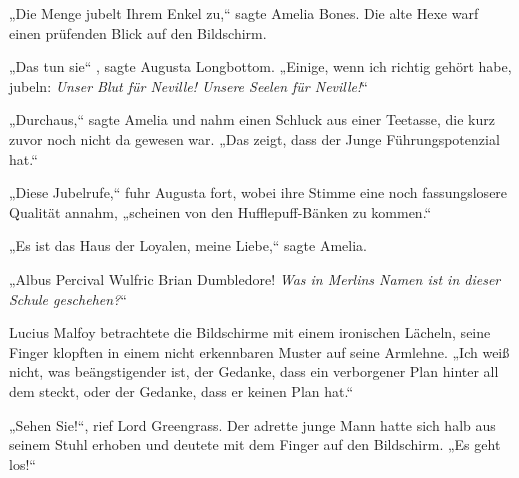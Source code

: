 „Die Menge jubelt Ihrem Enkel zu,“ sagte Amelia Bones. Die alte Hexe warf einen prüfenden Blick auf den Bildschirm.

„Das tun sie“ , sagte Augusta Longbottom. „Einige, wenn ich richtig gehört habe, jubeln: \emph{Unser Blut für Neville! Unsere Seelen für Neville!}“

„Durchaus,“ sagte Amelia und nahm einen Schluck aus einer Teetasse, die kurz zuvor noch nicht da gewesen war. „Das zeigt, dass der Junge Führungspotenzial hat.“

„Diese Jubelrufe,“ fuhr Augusta fort, wobei ihre Stimme eine noch fassungslosere Qualität annahm, „scheinen von den Hufflepuff-Bänken zu kommen.“

„Es ist das Haus der Loyalen, meine Liebe,“ sagte Amelia.

„Albus Percival Wulfric Brian Dumbledore! \emph{Was in Merlins Namen ist in dieser Schule geschehen?}“

Lucius Malfoy betrachtete die Bildschirme mit einem ironischen Lächeln, seine Finger klopften in einem nicht erkennbaren Muster auf seine Armlehne. „Ich weiß nicht, was beängstigender ist, der Gedanke, dass ein verborgener Plan hinter all dem steckt, oder der Gedanke, dass er keinen Plan hat.“

„Sehen Sie!“, rief Lord Greengrass. Der adrette junge Mann hatte sich halb aus seinem Stuhl erhoben und deutete mit dem Finger auf den Bildschirm. „Es geht los!“

